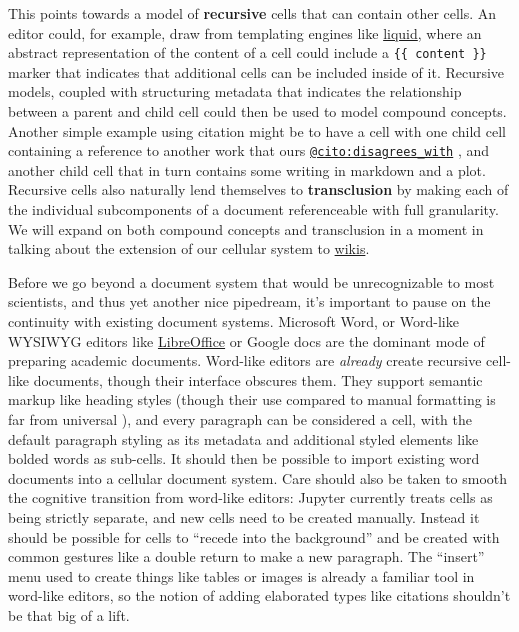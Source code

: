 This points towards a model of \textbf{recursive} cells that can contain
other cells. An editor could, for example, draw from templating engines
like \href{https://shopify.github.io/liquid/}{liquid}, where an abstract
representation of the content of a cell could include a
\texttt{\{\{\ content\ \}\}} marker that indicates that additional cells
can be included inside of it. Recursive models, coupled with structuring
metadata that indicates the relationship between a parent and child cell
could then be used to model compound concepts. Another simple example
using citation might be to have a cell with one child cell containing a
reference to another work that ours
\href{https://sparontologies.github.io/cito/current/cito.html\#d4e449}{\texttt{@cito:disagrees\_with}}
\citep{peroniFaBiOCiTOOntologies2012} , and another child cell
that in turn contains some writing in markdown and a plot. Recursive
cells also naturally lend themselves to \textbf{transclusion} by making
each of the individual subcomponents of a document referenceable with
full granularity. We will expand on both compound concepts and
transclusion in a moment in talking about the extension of our cellular
system to \protect\hyperlink{trackers-clients--wikis}{wikis}.

Before we go beyond a document system that would be unrecognizable to
most scientists, and thus yet another nice pipedream, it's important to
pause on the continuity with existing document systems. Microsoft Word,
or Word-like WYSIWYG editors like
\href{https://www.libreoffice.org/}{LibreOffice} or Google docs are the
dominant mode of preparing academic documents. Word-like editors are
\emph{already} create recursive cell-like documents, though their
interface obscures them. They support semantic markup like heading
styles (though their use compared to manual formatting is far from
universal \citep{sorgaardUseParagraphStyles1996} ), and every
paragraph can be considered a cell, with the default paragraph styling
as its metadata and additional styled elements like bolded words as
sub-cells. It should then be possible to import existing word documents
into a cellular document system. Care should also be taken to smooth the
cognitive transition from word-like editors: Jupyter currently treats
cells as being strictly separate, and new cells need to be created
manually. Instead it should be possible for cells to ``recede into the
background'' and be created with common gestures like a double return to
make a new paragraph. The ``insert'' menu used to create things like
tables or images is already a familiar tool in word-like editors, so the
notion of adding elaborated types like citations shouldn't be that big
of a lift.

